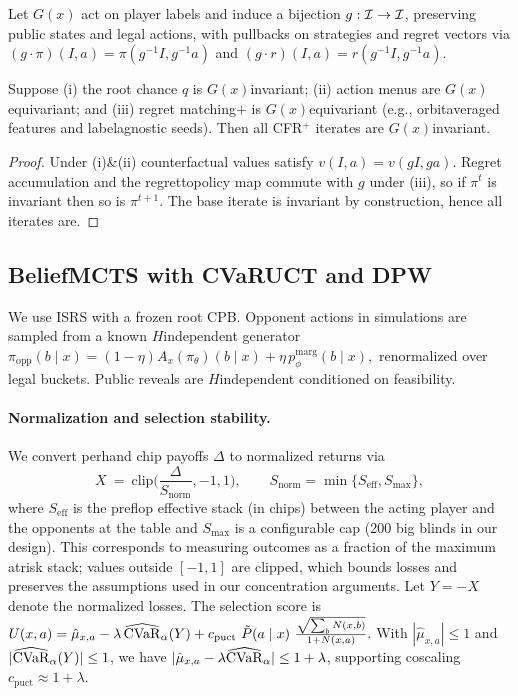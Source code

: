 \begin{definition}
Let $G(x)$ act on player labels and induce a bijection $g:\mathcal{I}\to\mathcal{I}$, preserving public states and legal actions, with pullbacks on strategies and regret vectors via $(g\cdot \pi)(I,a)=\pi(g^{-1}I,g^{-1}a)$ and $(g\cdot r)(I,a)=r(g^{-1}I,g^{-1}a)$.
\end{definition}

\begin{theorem}\label{thm:symm}
Suppose (i) the root chance $q$ is $G(x)$\textendash invariant; (ii) action menus are $G(x)$\textendash equivariant; and (iii) regret matching$+$ is $G(x)$\textendash equivariant (e.g., orbit\textendash averaged features and label\textendash agnostic seeds). Then all CFR$^+$ iterates are $G(x)$\textendash invariant.
\end{theorem}
\begin{proof}
Under (i)\&(ii) counterfactual values satisfy $v(I,a)=v(gI,ga)$. Regret accumulation and the regret\textendash to\textendash policy map commute with $g$ under (iii), so if $\pi^t$ is invariant then so is $\pi^{t+1}$. The base iterate is invariant by construction, hence all iterates are.
\end{proof}

\subsection{Belief\textendash MCTS with CVaR\textendash UCT and DPW}
We use IS\textendash RS with a frozen root CPB. Opponent actions in simulations are sampled from a known $H$\textendash independent generator
$
\pi_{\mathrm{opp}}(b\mid x)=(1-\eta)A_x(\pi_\theta)(b\mid x)+\eta\,p_\phi^{\mathrm{marg}}(b\mid x),
$
renormalized over legal buckets. Public reveals are $H$\textendash independent conditioned on feasibility.

\paragraph{Normalization and selection stability.}
We convert per\textendash hand chip payoffs $\Delta$ to normalized returns via
\[
X\ =\ \mathrm{clip}\Big(\frac{\Delta}{S_{\mathrm{norm}}},-1,1\Big),\qquad S_{\mathrm{norm}} = \min\{S_{\mathrm{eff}},S_{\max}\},
\]
where $S_{\mathrm{eff}}$ is the preflop effective stack (in chips) between the acting player and the opponents at the table and $S_{\max}$ is a configurable cap (200 big blinds in our design). This corresponds to measuring outcomes as a fraction of the maximum at\textendash risk stack; values outside $[-1,1]$ are clipped, which bounds losses and preserves the assumptions used in our concentration arguments. Let $Y=-X$ denote the normalized losses. The selection score is
$
U(x,a)=\hat\mu_{x,a}-\lambda\,\widehat{\CVaR}_\alpha(Y)+c_{\text{puct}}\ \tilde P(a\mid x)\ \frac{\sqrt{\sum_b N(x,b)}}{1+N(x,a)}.
$
With $|\hat\mu_{x,a}|\le 1$ and $|\widehat{\mathrm{CVaR}}_\alpha(Y)|\le 1$, we have $|\hat\mu_{x,a}-\lambda \widehat{\mathrm{CVaR}}_\alpha|\le 1+\lambda$, supporting co\textendash scaling $c_{\text{puct}}\approx 1+\lambda$.

